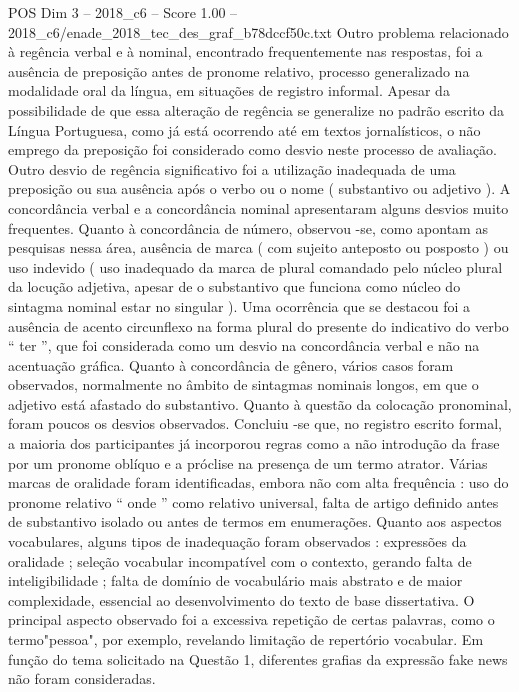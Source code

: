 \begin{textsample}{POS Dim 3 – 2018\_c6 – Score 1.00 – 2018\_c6/enade\_2018\_tec\_des\_graf\_b78dccf50c.txt}
Outro problema relacionado à regência verbal e à nominal, encontrado frequentemente nas respostas, foi a ausência de preposição antes de pronome relativo, processo generalizado na modalidade oral da língua, em situações de registro informal.
Apesar da possibilidade de que essa alteração de regência se generalize no padrão escrito da Língua Portuguesa, como já está ocorrendo até em textos jornalísticos, o não emprego da preposição foi considerado como desvio neste processo de avaliação.
Outro desvio de regência significativo foi a utilização inadequada de uma preposição ou sua ausência após o verbo ou o nome ( substantivo ou adjetivo ).
A concordância verbal e a concordância nominal apresentaram alguns desvios muito frequentes.
Quanto à concordância de número, observou -se, como apontam as pesquisas nessa área, ausência de marca ( com sujeito anteposto ou posposto ) ou uso indevido ( uso inadequado da marca de plural comandado pelo núcleo plural da locução adjetiva, apesar de o substantivo que funciona como núcleo do sintagma nominal estar no singular ).
Uma ocorrência que se destacou foi a ausência de acento circunflexo na forma plural do presente do indicativo do verbo “ ter ”, que foi considerada como um desvio na concordância verbal e não na acentuação gráfica.
Quanto à concordância de gênero, vários casos foram observados, normalmente no âmbito de sintagmas nominais longos, em que o adjetivo está afastado do substantivo.
Quanto à questão da colocação pronominal, foram poucos os desvios observados.
Concluiu -se que, no registro escrito formal, a maioria dos participantes já incorporou regras como a não introdução da frase por um pronome oblíquo e a próclise na presença de um termo atrator.
Várias marcas de oralidade foram identificadas, embora não com alta frequência : uso do pronome relativo “ onde ” como relativo universal, falta de artigo definido antes de substantivo isolado ou antes de termos em enumerações.
Quanto aos aspectos vocabulares, alguns tipos de inadequação foram observados : expressões da oralidade ; seleção vocabular incompatível com o contexto, gerando falta de inteligibilidade ; falta de domínio de vocabulário mais abstrato e de maior complexidade, essencial ao desenvolvimento do texto de base dissertativa.
O principal aspecto observado foi a excessiva repetição de certas palavras, como o termo"pessoa", por exemplo, revelando limitação de repertório vocabular.
Em função do tema solicitado na Questão 1, diferentes grafias da expressão fake news não foram consideradas.

\end{textsample}
